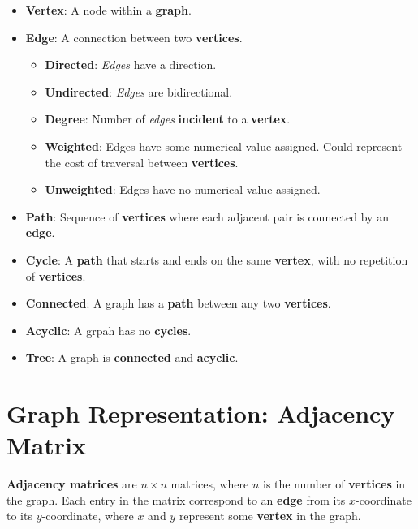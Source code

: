 \documentclass[12pt, letterpaper]{article}
\begin{document}
\begin{itemize}
    \item \textbf{Vertex}: A node within a \textbf{graph}.
    \item \textbf{Edge}: A connection between two \textbf{vertices}.
        \begin{itemize}
            \item \textbf{Directed}: \textit{Edges} have a direction.
            \item \textbf{Undirected}: \textit{Edges} are bidirectional.
            \item \textbf{Degree}: Number of \textit{edges} \textbf{incident} to a \textbf{vertex}.
            \item \textbf{Weighted}: Edges have some numerical value assigned. Could represent the cost of traversal between \textbf{vertices}.
            \item \textbf{Unweighted}: Edges have no numerical value assigned.
        \end{itemize}
    \item \textbf{Path}: Sequence of \textbf{vertices} where each adjacent pair is connected by an \textbf{edge}.
    \item \textbf{Cycle}: A \textbf{path} that starts and ends on the same \textbf{vertex}, with no repetition of \textbf{vertices}.
    \item \textbf{Connected}: A graph has a \textbf{path} between any two \textbf{vertices}.
    \item \textbf{Acyclic}: A grpah has no \textbf{cycles}.
    \item \textbf{Tree}: A graph is \textbf{connected} and \textbf{acyclic}.
\end{itemize}

\section*{Graph Representation: Adjacency Matrix}

\textbf{Adjacency matrices} are $ n \times n $ matrices, where $ n $ is the number of \textbf{vertices} in the graph. Each entry in the matrix correspond to an \textbf{edge} from its $ x $-coordinate to its $ y $-coordinate, where $ x $ and $ y $ represent some \textbf{vertex} in the graph.
\end{document}
